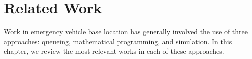 \chapter{Related Work}
\label{ch:RelatedWork}
Work in emergency vehicle base location
has generally involved the use of three approaches:
queueing,
mathematical programming,
and simulation.
In this chapter,
we review
the most relevant works
in each of these approaches.




